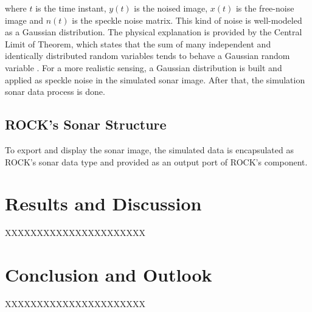 \documentclass[final,5p,times]{elsarticle}
\begin{document}
where $t$ is the time instant, $y(t)$ is the noised image, $x(t)$ is the free-noise image and $n(t)$ is the speckle noise matrix. This kind of noise is well-modeled as a Gaussian distribution. The physical explanation is provided by the Central Limit of Theorem, which states that the sum of many independent and identically distributed random variables tends to behave a Gaussian random variable \cite{papoulis2002}. For a more realistic sensing, a Gaussian distribution is built and applied as speckle noise in the simulated sonar image. After that, the simulation sonar data process is done.

\subsection{ROCK's Sonar Structure}
\label{}

To export and display the sonar image, the simulated data is encapsulated as ROCK's sonar data type and provided as an output port of ROCK's component.



\section{Results and Discussion}
\label{}

XXXXXXXXXXXXXXXXXXXXXX


\section{Conclusion and Outlook}
\label{}

XXXXXXXXXXXXXXXXXXXXXX



\end{document}
